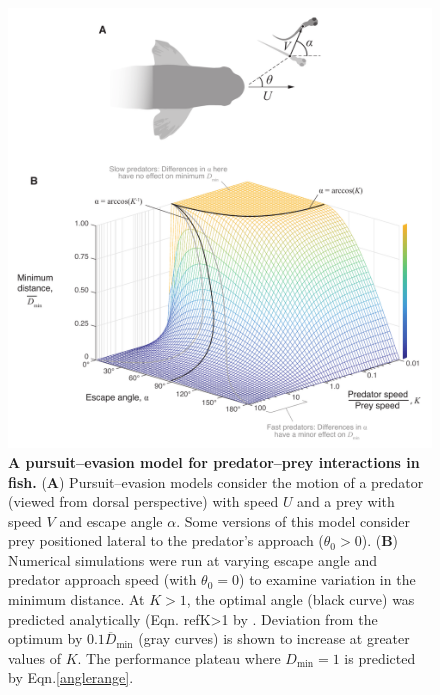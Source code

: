 \documentclass[12pt]{article}
\newcommand{\ol}{\overline}
\begin{document}
\pagebreak
\begin{figure}[t]
\begin{centering}
\includegraphics[width=1\textwidth]{Fig_02.pdf}
\centering	
\caption{\textbf{A pursuit--evasion model for predator--prey interactions in fish.}
(\textbf{A}) Pursuit--evasion models consider the motion of a predator (viewed from dorsal perspective) with speed $U$ and a prey with speed $V$ and escape angle $\alpha$. Some versions of this model consider prey positioned lateral to the predator's approach ($\theta_0>0$).  
(\textbf{B}) Numerical simulations were run at varying escape angle and predator approach speed (with $\theta_0=0$) to examine variation in the minimum distance. At $K>1$, the optimal angle (black curve) was predicted analytically (Eqn. ref{K>1} by \cite{Weihs:1984tb}. Deviation from the optimum by $0.1\ol D_{\text{min}}$ (gray curves) is shown to increase at greater values of $K$. The performance plateau where $D_{\text{min}}=1$ is predicted by Eqn.\ref{anglerange}.}
\label{weihs_topo}
\end{centering}
\end{figure}
\end{document}
